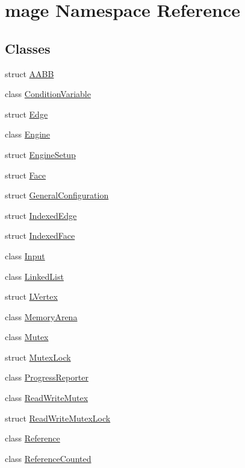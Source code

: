 \hypertarget{namespacemage}{}\section{mage Namespace Reference}
\label{namespacemage}
\subsection*{Classes}
\begin{DoxyCompactItemize}
\item 
struct \hyperlink{structmage_1_1_a_a_b_b}{A\+A\+BB}
\item 
class \hyperlink{classmage_1_1_condition_variable}{Condition\+Variable}
\item 
struct \hyperlink{structmage_1_1_edge}{Edge}
\item 
class \hyperlink{classmage_1_1_engine}{Engine}
\item 
struct \hyperlink{structmage_1_1_engine_setup}{Engine\+Setup}
\item 
struct \hyperlink{structmage_1_1_face}{Face}
\item 
struct \hyperlink{structmage_1_1_general_configuration}{General\+Configuration}
\item 
struct \hyperlink{structmage_1_1_indexed_edge}{Indexed\+Edge}
\item 
struct \hyperlink{structmage_1_1_indexed_face}{Indexed\+Face}
\item 
class \hyperlink{classmage_1_1_input}{Input}
\item 
class \hyperlink{classmage_1_1_linked_list}{Linked\+List}
\item 
struct \hyperlink{structmage_1_1_l_vertex}{L\+Vertex}
\item 
class \hyperlink{classmage_1_1_memory_arena}{Memory\+Arena}
\item 
class \hyperlink{classmage_1_1_mutex}{Mutex}
\item 
struct \hyperlink{structmage_1_1_mutex_lock}{Mutex\+Lock}
\item 
class \hyperlink{classmage_1_1_progress_reporter}{Progress\+Reporter}
\item 
class \hyperlink{classmage_1_1_read_write_mutex}{Read\+Write\+Mutex}
\item 
struct \hyperlink{structmage_1_1_read_write_mutex_lock}{Read\+Write\+Mutex\+Lock}
\item 
class \hyperlink{classmage_1_1_reference}{Reference}
\item 
class \hyperlink{classmage_1_1_reference_counted}{Reference\+Counted}

\end{DoxyCompactItemize}
